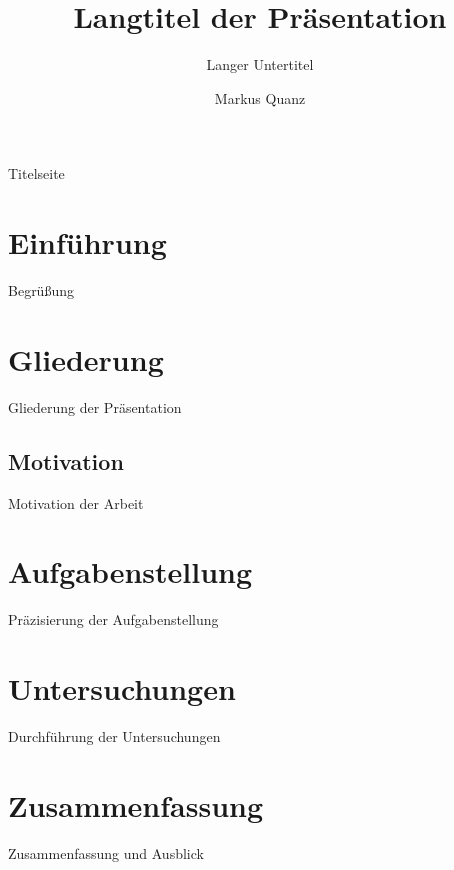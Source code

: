 \documentclass{beamer}
\title[Kurztitel Präsentation]{Langtitel der Präsentation}
\subtitle[Kurzer Untertitel]{Langer Untertitel}
\author{Markus Quanz}
\begin{document}
	
	\begin{frame}{Titelseite}
		\titlepage
	\end{frame}
	
	\section{Einführung}
	\begin{frame}{Begrüßung}
	\end{frame}
	
	\section{Gliederung}
	\begin{frame}{Gliederung der Präsentation}
		\tableofcontents
	\end{frame}
	
	\subsection*{Motivation}
	\begin{frame}{Motivation der Arbeit}
	\end{frame}
	
	\section{Aufgabenstellung}

	
	\begin{frame}{Präzisierung der Aufgabenstellung}
	\end{frame}
	
	\section{Untersuchungen}
	\begin{frame}{Durchführung der Untersuchungen}
	\end{frame}
	
	\section{Zusammenfassung}
	\begin{frame}{Zusammenfassung und Ausblick}
	\end{frame}
	
	
\end{document}

